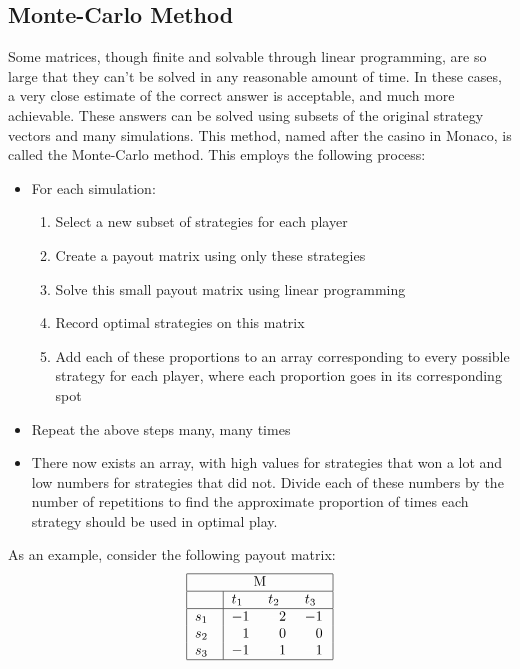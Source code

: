 \documentclass[11pt]{article}
\begin{document}
\subsection{Monte-Carlo Method}

Some matrices, though finite and solvable through linear programming,
are so large that they can't be solved in any reasonable amount of
time. In these cases, a very close estimate of the correct answer is
acceptable, and much more achievable. These answers can be solved using
subsets of the original strategy vectors and many simulations. This
method, named after the casino in Monaco\cite{montecarlo}, is called
the Monte-Carlo method. This employs the following process:
\begin{itemize}
\item For each simulation:
\begin{enumerate}
\item Select a new subset of strategies for each player
\item Create a payout matrix using only these strategies
\item Solve this small payout matrix using linear programming
\item Record optimal strategies on this matrix
\item Add each of these proportions to an array corresponding to every
possible strategy for each player, where each proportion goes in its
corresponding spot
\end{enumerate}
\item Repeat the above steps many, many times
\item There now exists an array, with high values for strategies that won
a lot and low numbers for strategies that did not. Divide each of these
numbers by the number of repetitions to find the approximate proportion
of times each strategy should be used in optimal play.
\end{itemize}
As an example, consider the following payout matrix:
\begin{equation*}
\begin{tabular}{ |p{0.5cm}|p{0.5cm} p{0.5cm} p{0.5cm}|  }
\hline
\multicolumn{4}{|c|}{M} \\
\hline
\textcolor{white}{.}& $t_1$ & $t_2$ & $t_3$\\
\hline
$s_1$ & $-1$ & $\textcolor{white}{-}$2 & $-1$\\
$s_2$ & $\textcolor{white}{-}$1 & $\textcolor{white}{-}$0 & $\textcolor{white}{-}$0\\
$s_3$ & $-1$ & $\textcolor{white}{-}$1 & $\textcolor{white}{-}$1\\
\hline
\end{tabular}
\end{equation*}
\end{document}
